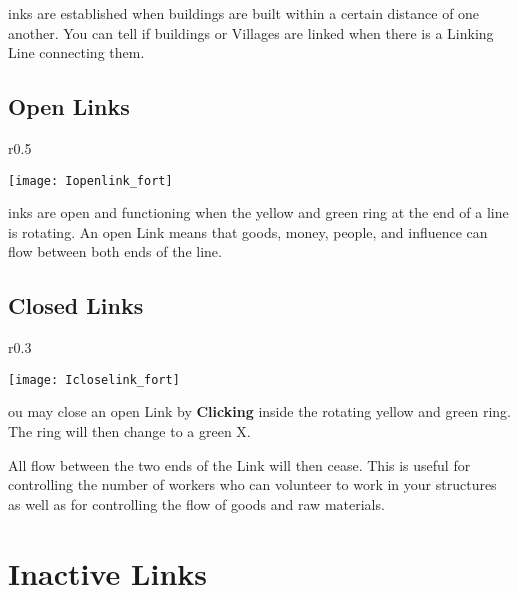 inks are established when buildings are built within a certain distance of one another. You can tell if buildings or Villages are linked when there is a Linking Line connecting them.

\subsection{\textsf{Open Links}}


\begin{wrapfigure}{r}{0.5\textwidth}
    \vspace{-20pt}
    \begin{center}
        \texttt{[image: Iopenlink\_fort]} %
    \end{center}
    \vspace{-20pt}
\end{wrapfigure}

inks are open and functioning when the yellow and green ring at the end of a line is rotating. An open Link means that goods, money, people, and influence can flow between both ends of the line.

\subsection{\textsf{Closed Links}}


\begin{wrapfigure}{r}{0.3\textwidth}
    \vspace{-20pt}
    \begin{center}
        \texttt{[image: Icloselink\_fort]} %
    \end{center}
    \vspace{-10pt}
\end{wrapfigure}

ou may close an open Link by \textbf{Clicking} inside the rotating yellow and green ring. The ring will then change to a green X.

All flow between the two ends of the Link will then cease. This is useful for controlling the number of workers who can volunteer to work in your structures as well as for controlling the flow of goods and raw materials.

\section{\textsf{Inactive Links}}

